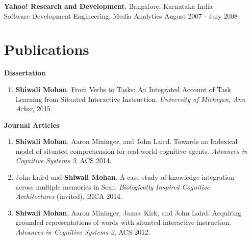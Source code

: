 \documentclass[margin,line,11pt]{res}
\begin{document}
\begin{resume}
                  {\bf Yahoo! Research and Development}, Bangalore, Karnataka India \\ {Software Development Engineering}, Media Analytics \hfill August 2007 - July 2008



                  \section{\sc Publications}
                  \textbf{Dissertation}
                  \begin{enumerate}[label=\lbrack D\arabic*\rbrack, leftmargin=*]
                  \item \textbf{Shiwali Mohan}.  From Verbs to Tasks: An Integrated Account of Task Learning from Situated Interactive Instruction. \emph{University of Michigan, Ann Arbor}, 2015.
                  \end{enumerate}
                  \textbf{Journal Articles}
                  \begin{enumerate}[label=\lbrack J\arabic*\rbrack, leftmargin=*]
                  \item \textbf{Shiwali Mohan}, Aaron Mininger, and John Laird. Towards an Indexical model of situated comprehension for real-world cognitive agents. \emph{Advances in Cognitive Systems 3}, ACS 2014.
                  \item John Laird and \textbf{Shiwali Mohan}. A case study of knowledge integration across multiple memories in Soar. \emph{Biologically Inspired Cognitive Architectures} (invited), BICA 2014.
                  \item \textbf{Shiwali Mohan}, Aaron Mininger, James Kirk, and John Laird. Acquiring grounded representations of words with situated interactive instruction. \emph{Advances in Cognitive Systems 2}, ACS 2012.
                  \end{enumerate}


\end{resume}
\end{document}
